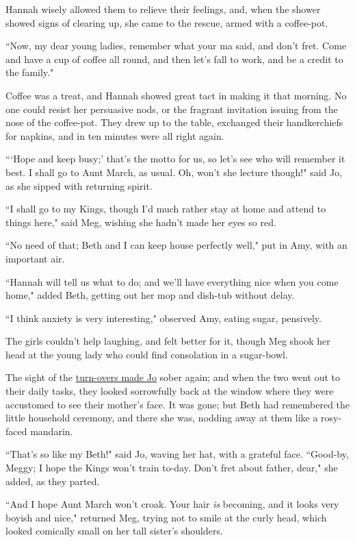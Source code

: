 Hannah wisely allowed them to relieve their feelings, and, when the
shower showed signs of clearing up, she came to the rescue, armed with a
coffee-pot.

``Now, my dear young ladies, remember what your ma said, and
don't fret. Come and have a cup of coffee all round, and
then let's fall to work, and be a credit to the family."

Coffee was a treat, and Hannah showed great tact in making it that
morning. No one could resist her persuasive nods, or the fragrant
invitation issuing from the nose of the coffee-pot. They drew up to the
table, exchanged their handkerchiefs for napkins, and in ten minutes
were all right again.

```Hope and keep busy;'
that's the motto for us, so let's see
who will remember it best. I shall go to Aunt March, as usual. Oh,
won't she lecture though!" said Jo, as she sipped with
returning spirit.

``I shall go to my Kings, though I'd much rather stay at
home and attend to things here," said Meg, wishing she
hadn't made her eyes so red.

``No need of that; Beth and I can keep house perfectly well," put in Amy,
with an important air.

``Hannah will tell us what to do; and we'll have
everything nice when you come home," added Beth, getting out her mop and
dish-tub without delay.

``I think anxiety is very interesting," observed Amy, eating sugar,
pensively.

The girls couldn't help laughing, and felt better for
it, though Meg shook her head at the young lady who could find
consolation in a sugar-bowl.

The sight of the \underline{turn-overs made Jo} sober again; and when the two
went out to their daily tasks, they looked sorrowfully back at the
window where they were accustomed to see their mother's
face. It was gone; but Beth had remembered the little household
ceremony, and there she was, nodding away at them like a rosy-faced
mandarin.

``That's so like my Beth!" said Jo, waving her hat, with
a grateful face. ``Good-by, Meggy; I hope the Kings won't
train to-day. Don't fret about father, dear," she added,
as they parted.

``And I hope Aunt March won't croak. Your hair \emph{is}
becoming, and it looks very boyish and nice," returned Meg, trying not
to smile at the curly head, which looked comically small on her tall
sister's shoulders.

